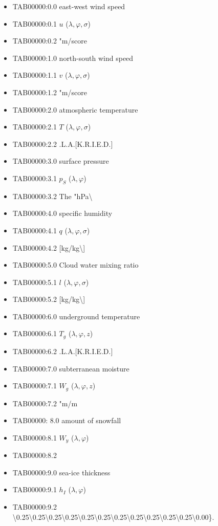 \begin{itemize}
\item
  TAB00000:0.0 east-west wind speed
\item
  TAB00000:0.1 \(u\) (\(\lambda,\varphi,\sigma\))
\item
  TAB00000:0.2 \The "m/score
\item
  TAB00000:1.0 north-south wind speed
\item
  TAB00000:1.1 \(v\) (\(\lambda,\varphi,\sigma\))
\item
  TAB00000:1.2 \The "m/score
\item
  TAB00000:2.0 atmospheric temperature
\item
  TAB00000:2.1 \(T\) (\(\lambda,\varphi,\sigma\))
\item
  TAB00000:2.2 \K.L.A.{[}K.R.I.E.D.{]}
\item
  TAB00000:3.0 surface pressure
\item
  TAB00000:3.1 \(p_S\) (\(\lambda,\varphi\))
\item
  TAB00000:3.2 The "hPa\textbackslash{}
\item
  TAB00000:4.0 specific humidity
\item
  TAB00000:4.1 \(q\) (\(\lambda,\varphi,\sigma\))
\item
  TAB00000:4.2 {[}kg/kg\textbackslash{]}
\item
  TAB00000:5.0 Cloud water mixing ratio
\item
  TAB00000:5.1 \(l\) (\(\lambda,\varphi,\sigma\))
\item
  TAB00000:5.2 {[}kg/kg\textbackslash{]}
\item
  TAB00000:6.0 underground temperature
\item
  TAB00000:6.1 \(T_g\) (\(\lambda,\varphi,z\))
\item
  TAB00000:6.2 \K.L.A.{[}K.R.I.E.D.{]}
\item
  TAB00000:7.0 subterranean moisture
\item
  TAB00000:7.1 \(W_g\) (\(\lambda,\varphi,z\))
\item
  TAB00000:7.2 \The "m/m\\
\item
  TAB00000: 8.0 amount of snowfall
\item
  TAB00000:8.1 \(W_y\) (\(\lambda,\varphi\))
\item
  TAB00000:8.2
\item
  TAB00000:9.0 sea-ice thickness
\item
  TAB00000:9.1 \(h_I\) (\(\lambda,\varphi\))
\item
  TAB00000:9.2
  \textbackslash0.25\textbackslash0.25\textbackslash0.25\textbackslash0.25\textbackslash0.25\textbackslash0.25\textbackslash0.25\textbackslash0.25\textbackslash0.25\textbackslash0.25\textbackslash0.25\textbackslash0.00\}.
\end{itemize}

